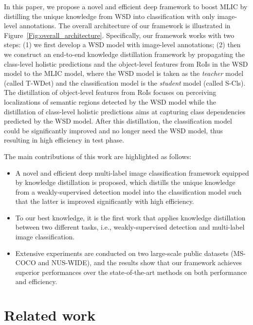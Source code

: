 \documentclass[sigconf,natbib=false]{acmart}
\begin{document}
In this paper, we propose a novel and efficient deep framework to boost MLIC by distilling the unique knowledge from WSD into classification with only image-level annotations.
The overall architecture of our framework is illustrated in Figure~\ref{Fig:overall_architecture}.
Specifically, our framework works with two steps: (1) we first develop a WSD model with image-level annotations; (2) then we construct an end-to-end knowledge distillation framework by propagating the class-level holistic predictions and the object-level features from RoIs in the WSD model to the MLIC model, where the WSD model is taken as the \emph{teacher} model (called T-WDet) and the classification model is the \emph{student} model (called S-Cls).
The distillation of object-level features from RoIs focuses on perceiving localizations of semantic regions detected by the WSD model while the distillation of class-level holistic predictions aims at capturing class dependencies predicted by the WSD model.
After this distillation, the classification model could be significantly improved and no longer need the WSD model, thus resulting in high efficiency in test phase.



The main contributions of this work are highlighted as follows:
\vspace{5pt}
\begin{itemize}
\setlength{\itemsep}{0ex}
\item A novel and efficient deep multi-label image classification framework equipped by knowledge distillation is proposed, which distills the unique knowledge from a weakly-supervised detection model into the classification model such that the latter is improved significantly with high efficiency.
\item To our best knowledge, it is the first work that applies knowledge distillation between two different tasks, i.e., weakly-supervised detection and multi-label image classification.
\item Extensive experiments are conducted on two large-scale public datasets (MS-COCO and NUS-WIDE), and the results show that our framework achieves superior performances over the state-of-the-art methods on both performance and efficiency.
\end{itemize}
\vspace{-13pt}
\section{Related work}
\end{document}
